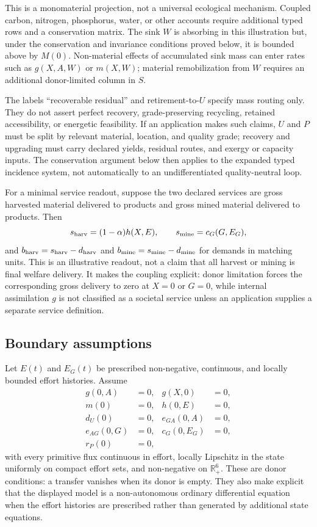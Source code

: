 \documentclass[11pt]{article}
\newcommand{\R}{\mathbb R}
\begin{document}
This is a monomaterial projection, not a universal ecological mechanism. Coupled carbon, nitrogen, phosphorus, water, or other accounts require additional typed rows and a conservation matrix. The sink $W$ is absorbing in this illustration but, under the conservation and invariance conditions proved below, it is bounded above by $M(0)$. Non-material effects of accumulated sink mass can enter rates such as $g(X,A,W)$ or $m(X,W)$; material remobilization from $W$ requires an additional donor-limited column in $S$.

The labels ``recoverable residual'' and retirement-to-$U$ specify mass routing only. They do not assert perfect recovery, grade-preserving recycling, retained accessibility, or energetic feasibility. If an application makes such claims, $U$ and $P$ must be split by relevant material, location, and quality grade; recovery and upgrading must carry declared yields, residual routes, and exergy or capacity inputs. The conservation argument below then applies to the expanded typed incidence system, not automatically to an undifferentiated quality-neutral loop.

For a minimal service readout, suppose the two declared services are gross harvested material delivered to products and gross mined material delivered to products. Then
\begin{equation}
s_{\rm harv}=(1-\alpha)h(X,E),
\qquad
s_{\rm mine}=c_G(G,E_G),
\label{eq:example-service-readout}
\end{equation}
and $b_{\rm harv}=s_{\rm harv}-d_{\rm harv}$ and $b_{\rm mine}=s_{\rm mine}-d_{\rm mine}$ for demands in matching units. This is an illustrative readout, not a claim that all harvest or mining is final welfare delivery. It makes the coupling explicit: donor limitation forces the corresponding gross delivery to zero at $X=0$ or $G=0$, while internal assimilation $g$ is not classified as a societal service unless an application supplies a separate service definition.

\subsection{Boundary assumptions}

Let $E(t)$ and $E_G(t)$ be prescribed non-negative, continuous, and locally bounded effort histories. Assume
\begin{align*}
g(0,A)&=0, & g(X,0)&=0,\\
m(0)&=0, & h(0,E)&=0,\\
d_U(0)&=0, & e_{GA}(0,A)&=0,\\
e_{AG}(0,G)&=0, & c_G(0,E_G)&=0,\\
r_P(0)&=0,
\end{align*}
with every primitive flux continuous in effort, locally Lipschitz in the state uniformly on compact effort sets, and non-negative on $\R_+^6$. These are donor conditions: a transfer vanishes when its donor is empty. They also make explicit that the displayed model is a non-autonomous ordinary differential equation when the effort histories are prescribed rather than generated by additional state equations.
\end{document}

